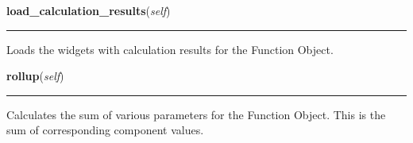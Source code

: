 \hspace{.8\funcindent}\begin{boxedminipage}{\funcwidth}

    \raggedright \textbf{load\_calculation\_results}(\textit{self})

    \vspace{-1.5ex}

    \rule{\textwidth}{0.5\fboxrule}
\setlength{\parskip}{2ex}
    Loads the widgets with calculation results for the Function Object.

\setlength{\parskip}{1ex}
    \end{boxedminipage}

    \label{reliafree:function:Function:rollup}

    \vspace{0.5ex}

\hspace{.8\funcindent}\begin{boxedminipage}{\funcwidth}

    \raggedright \textbf{rollup}(\textit{self})

    \vspace{-1.5ex}

    \rule{\textwidth}{0.5\fboxrule}
\setlength{\parskip}{2ex}
    Calculates the sum of various parameters for the Function Object. This 
    is the sum of corresponding component values.

\setlength{\parskip}{1ex}
    \end{boxedminipage}

